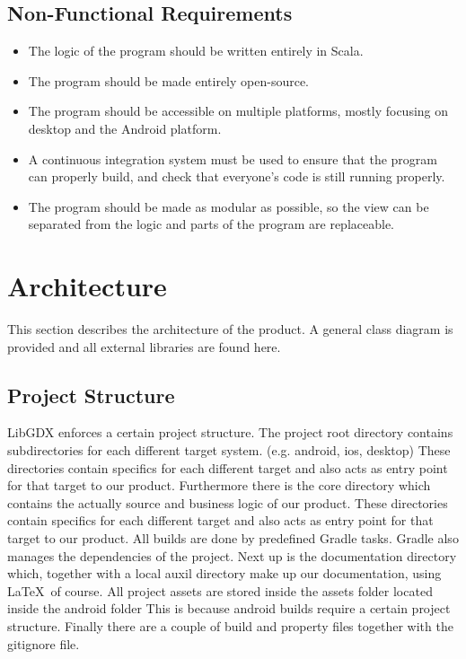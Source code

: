 \documentclass[10pt]{extarticle} %
\begin{document}
    \subsection{Non-Functional Requirements}
    \begin{itemize}
        \item The logic of the program should be written entirely in Scala.
        \item The program should be made entirely open-source.
        \item The program should be accessible on multiple platforms, mostly focusing on desktop and the Android platform.
        \item A continuous integration system must be used to ensure that the program can properly build, and check that everyone's code is still running properly.
        \item The program should be made as modular as possible, so the view can be separated from the logic and parts of the program are replaceable.
    \end{itemize}
    \newpage

    \section{Architecture}
    This section describes the architecture of the product.
    A general class diagram is provided and all external libraries are found here.
    \subsection{Project Structure}
    LibGDX enforces a certain project structure\cite{libgdxprojstruct}.
    The project root directory contains subdirectories for each different target system. (e.g. android, ios, desktop)
    These directories contain specifics for each different target and also acts as entry point for that target to our product.
    Furthermore there is the core directory which contains the actually source and business logic of our product.
    These directories contain specifics for each different target and also acts as entry point for that target to our product.
    All builds are done by predefined Gradle tasks.
    Gradle also manages the dependencies of the project.
    Next up is the documentation directory which, together with a local auxil directory make up our documentation, using \LaTeX\ of course.
    All project assets are stored inside the assets folder located inside the android folder
    This is because android builds require a certain project structure\cite{androidAssetLocation}.
    Finally there are a couple of build and property files together with the gitignore file.
\end{document}
